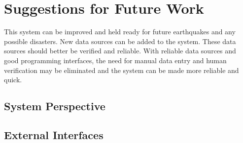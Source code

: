 \documentclass[a4paper]{article}
\begin{document}
    \section{Suggestions for Future Work}


    This system can be improved and held ready for future earthquakes and any possible disasters.
    New data sources can be added to the system. These data sources should better be verified and reliable. With reliable data sources and good programming interfaces, the need for manual data entry and human verification may be eliminated and
    the system can be made more reliable and quick.
    
        \subsection{System Perspective}
    

        \subsection{External Interfaces}

        
\end{document}
